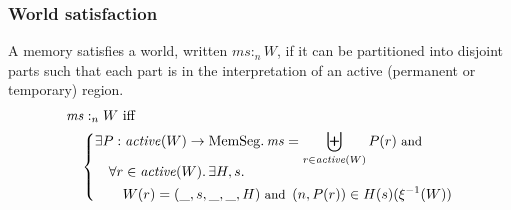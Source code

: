\documentclass[compsoc,conference,letterpaper,fleqn]{IEEEtran}
\DeclareMathOperator{\dom}{dom}
\newcommand{\var}[1]{\mathit{#1}}
\newcommand{\hs}{\var{ms}}
\newcommand{\ms}{\hs}
\newcommand{\heap}{\var{mem}}
\newcommand{\plainfun}[2]{
  \ifthenelse{\equal{#2}{}}
  {\mathit{#1}}
  {\mathit{#1}(#2)}
}
\newcommand{\activeReg}[1]{\plainfun{active}{#1}}
\newcommand{\futurewk}{\mathbin{\sqsupseteq}^{\var{pub}}}
\newcommand{\futurestr}{\mathbin{\sqsupseteq}^{\var{priv}}}
\newcommand{\heapSat}[3][\heap]{#1 :_{#2} #3}
\newcommand{\memSat}[3][n]{\heapSat[#2]{#1}{#3}}
\newcommand{\plaindom}[1]{\mathrm{#1}}
\newcommand{\HeapSegments}{\plaindom{MemSeg}}
\newcommand{\npair}[2][n]{\left(#1,#2 \right)}
\begin{document}




\subsubsection{World satisfaction}
A memory satisfies a world, written $\memSat{\ms}{W}$, 
if it can be partitioned into disjoint parts such that each part is
in the interpretation of an active (permanent or temporary) region. 
\begin{align*}
  &\memSat{\ms}{W}
    \text{ iff }\\
  &\quad \left\{\begin{aligned}
        &\exists P : \activeReg{W} \rightarrow \HeapSegments \ldotp \hs = \biguplus_{r\in\activeReg{W}}P(r) \text{\footnotesize{ and }} \\[-.2cm]
        &\quad \forall r \in \activeReg{W} \ldotp \exists H,s \ldotp\\
        &\qquad W(r) = (\_,s,\_,\_,H) \text{\footnotesize{ and }} \npair[n]{P(r)} \in H(s)(\xi^{-1}(W))\\
      \end{aligned}\right.
\end{align*}
\end{document}
